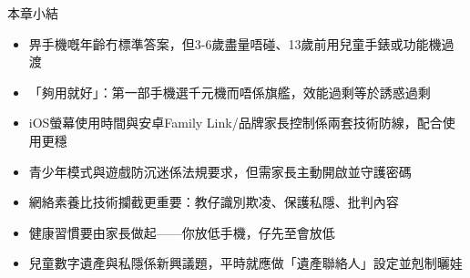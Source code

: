 \begin{tcbsummary}{本章小結}
\begin{itemize}
  \item 畀手機嘅年齡冇標準答案，但3-6歲盡量唔碰、13歲前用兒童手錶或功能機過渡
  \item 「夠用就好」：第一部手機選千元機而唔係旗艦，效能過剩等於誘惑過剩
  \item iOS螢幕使用時間與安卓Family Link/品牌家長控制係兩套技術防線，配合使用更穩
  \item 青少年模式與遊戲防沉迷係法規要求，但需家長主動開啟並守護密碼
  \item 網絡素養比技術攔截更重要：教仔識別欺凌、保護私隱、批判內容
  \item 健康習慣要由家長做起——你放低手機，仔先至會放低
  \item 兒童數字遺產與私隱係新興議題，平時就應做「遺產聯絡人」設定並剋制曬娃
\end{itemize}

\end{tcbsummary}
